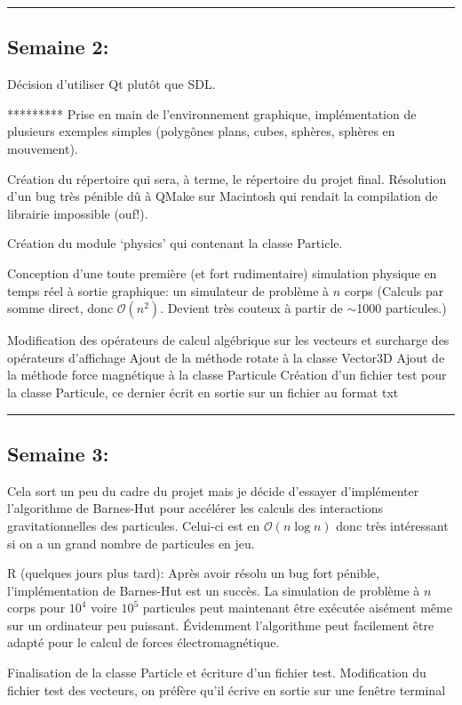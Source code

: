 \documentclass[12pt, letterpaper, twoside]{article}
\begin{document}
\rule{\textwidth}{0.4pt}

\subsection{Semaine 2:}
Décision d'utiliser Qt plutôt que SDL.

*********
Prise en main de l'environnement graphique, implémentation de plusieurs exemples simples (polygônes plans, cubes, sphères, sphères en mouvement).

Création du répertoire qui sera, à terme, le répertoire du projet final.
Résolution d'un bug très pénible dû à QMake sur Macintosh qui rendait la compilation de librairie impossible (ouf!).

Création du module `physics' qui contenant la classe Particle.

Conception d'une toute première (et fort rudimentaire) simulation physique en temps réel à sortie graphique: un simulateur de problème à $n$ corps (Calculs par somme direct, donc $\mathcal{O}(n^2)$. Devient très couteux à partir de $\sim$1000 particules.)

Modification des opérateurs de calcul algébrique sur les vecteurs et surcharge des opérateurs d'affichage
Ajout de la méthode rotate à la classe Vector3D
Ajout de la méthode force magnétique à la classe Particule
Création d'un fichier test pour la classe Particule, ce dernier écrit en sortie sur un fichier au format txt

\rule{\textwidth}{0.4pt}

\subsection{Semaine 3:}
Cela sort un peu du cadre du projet mais je décide d'essayer d'implémenter l'algorithme de Barnes-Hut pour accélérer les calculs des interactions gravitationnelles des particules. Celui-ci est en  $\mathcal{O}(n\log{}n)$ donc très intéressant si on a un grand nombre de particules en jeu.

R (quelques jours plus tard): Après avoir résolu un bug fort pénible, l'implémentation de Barnes-Hut est un succès. La simulation de problème à $n$ corps pour $10^4$ voire $10^5$ particules peut maintenant être exécutée aisément même sur un ordinateur peu puissant. Évidemment l'algorithme peut facilement être adapté pour le calcul de forces électromagnétique.

Finalisation de la classe Particle et écriture d'un fichier test. Modification du fichier test des vecteurs, on préfère qu'il écrive en sortie sur une fenêtre terminal
\end{document}
